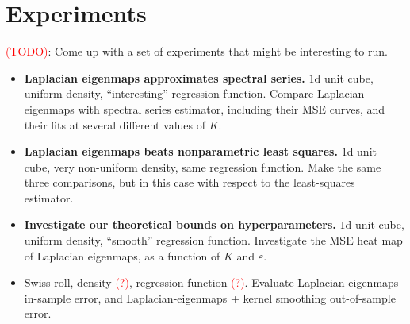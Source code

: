 \documentclass{article}
\newcommand{\Reals}{\mathbb{R}}
\newcommand{\1}{\mathbf{1}}
\newcommand{\mc}[1]{\mathcal{#1}}
\theoremstyle{alden}
\theoremstyle{aldenthm}
\theoremstyle{definition}
\theoremstyle{remark}
\begin{document}
\begin{itemize}
\end{itemize}

\section{Experiments}
\label{sec:experiments}

\textcolor{red}{(TODO)}: Come up with a set of experiments that might be interesting to run. 

\begin{itemize}
	\item \textbf{Laplacian eigenmaps approximates spectral series.} $1$d unit cube, uniform density, ``interesting'' regression function. Compare Laplacian eigenmaps with spectral series estimator, including their MSE curves, and their fits at several different values of $K$. 
	\item \textbf{Laplacian eigenmaps beats nonparametric least squares.} $1$d unit cube, very non-uniform density, same regression function. Make the same three comparisons, but in this case with respect to the least-squares estimator.
	\item \textbf{Investigate our theoretical bounds on hyperparameters.} $1$d unit cube, uniform density, ``smooth'' regression function. Investigate the MSE heat map of Laplacian eigenmaps, as a function of $K$ and $\varepsilon$.
	\item Swiss roll, density \textcolor{red}{(?)}, regression function \textcolor{red}{(?)}. Evaluate Laplacian eigenmaps in-sample error, and Laplacian-eigenmaps + kernel smoothing out-of-sample error.
\end{itemize}
\end{document}
